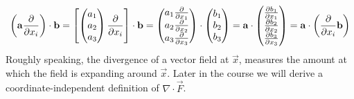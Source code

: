 \documentclass[../main.tex]{subfiles}
\begin{document}
\begin{equation}
  \left(\vec{a} \pderiv{}{x_i}\right) \cdot \vec{b} =
  \left[\begin{pmatrix}
  a_1 \\
  a_2 \\
  a_3 \\
  \end{pmatrix} \pderiv{}{x_i}\right] \cdot \vec{b} =
  \begin{pmatrix}
  a_1 \pderiv{}{x_1} \\
  a_2 \pderiv{}{x_2} \\
  a_3 \pderiv{}{x_3} \\
  \end{pmatrix} \cdot
  \begin{pmatrix}
  b_1 \\
  b_2 \\
  b_3 \\
  \end{pmatrix}
  = \vec{a} \cdot \begin{pmatrix}
  \pderiv{b_1}{x_1} \\
  \pderiv{b_2}{x_2} \\
  \pderiv{b_3}{x_3} \\
  \end{pmatrix} =
  \vec{a} \cdot \left(\pderiv{}{x_i} \vec{b}\right) \label{scalarOperatorMove}
\end{equation}
Roughly speaking, the divergence of a vector field at $\vec{x}$, measures the amount at which the field is expanding around $\vec{x}$.
Later in the course we will derive a coordinate-independent definition of $\nabla \cdot \vec{F}$.
\end{document}
